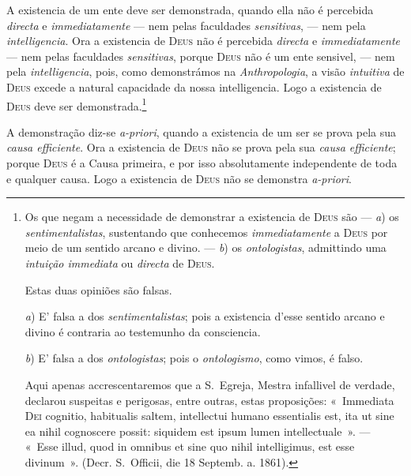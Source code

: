 A existencia de um ente deve ser demonstrada, quando ella não é percebida
\emph{directa} e \emph{immediatamente} --- nem pelas faculdades \emph{sensitivas},
--- nem pela \emph{intelligencia}. Ora a existencia de \textsc{Deus} não é
percebida \emph{directa} e \emph{immediatamente} --- nem pelas faculdades
\emph{sensitivas}, porque \textsc{Deus} não é um ente sensivel, --- nem pela
\emph{intelligencia}, pois, como demonstrámos na \emph{Anthropologia}, a visão
\emph{intuitiva} de \textsc{Deus} excede a natural capacidade da nossa intelligencia.
Logo a existencia de \textsc{Deus} deve ser demonstrada.\footnote{Os que negam a
necessidade de demonstrar a existencia de \textsc{Deus} são --- \emph{a}) os
\emph{sentimentalistas}, sustentando que conhecemos \emph{immediatamente} a
\textsc{Deus} por meio de um sentido arcano e divino. --- \emph{b}) os
\emph{ontologistas}, admittindo uma \emph{intuição immediata} ou \emph{directa} de
\textsc{Deus}.

Estas duas opiniões são falsas.

\emph{a}) E' falsa a dos \emph{sentimentalistas}; pois a existencia d'esse sentido
arcano e divino é contraria ao testemunho da consciencia.

\emph{b}) E' falsa a dos \emph{ontologistas}; pois o \emph{ontologismo}, como vimos, é
falso.

Aqui apenas accrescentaremos que a S.~Egreja, Mestra infallivel de verdade, declarou
suspeitas e perigosas, entre outras, estas proposições: «~Immediata \textsc{Dei}
cognitio, habitualis saltem, intellectui humano essentialis est, ita ut sine ea nihil
cognoscere possit: siquidem est ipsum lumen intellectuale~». --- «~Esse illud, quod in
omnibus et sine quo nihil intelligimus, est esse divinum~». (Decr. S.~Officii, die 18
Septemb. a. 1861).}

A demonstração diz-se \emph{a-priori}, quando a existencia de um ser se prova
 pela sua \emph{causa efficiente}. Ora a existencia de \textsc{Deus} não se
prova pela sua \emph{causa efficiente}; porque \textsc{Deus} é a Causa primeira, e por
isso absolutamente independente de toda e qualquer causa. Logo a existencia de
\textsc{Deus} não se demonstra \emph{a-priori}.

